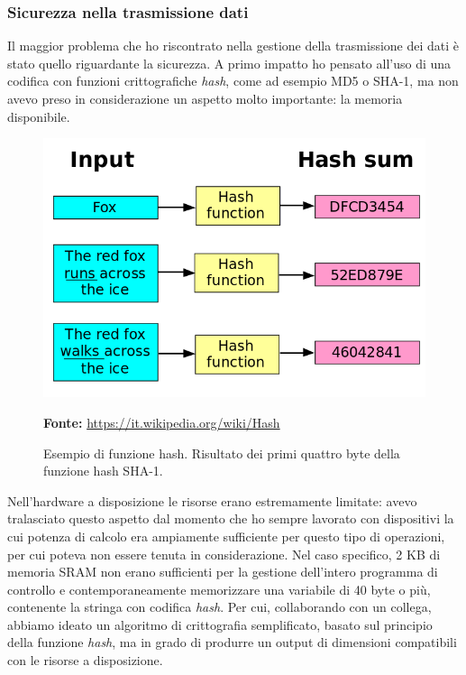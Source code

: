 \subsubsection{Sicurezza nella trasmissione dati}
Il maggior problema che ho riscontrato nella gestione della trasmissione dei dati è stato quello riguardante la sicurezza. A primo impatto ho pensato all'uso di una codifica con funzioni crittografiche \textit{hash}, come ad esempio MD5 o SHA-1, ma non avevo preso in considerazione un aspetto molto importante: la memoria disponibile. 

\begin{figure}[H]
	\begin{center}
	\includegraphics[scale=0.4]{immagini/hash.png}
	\caption{Esempio di funzione hash. Risultato dei primi quattro byte della funzione hash SHA-1.}
	\small{\textbf{Fonte:} \url{https://it.wikipedia.org/wiki/Hash}}
	\end{center}
\end{figure}

Nell'hardware a disposizione le risorse erano estremamente limitate: avevo tralasciato questo aspetto dal momento che ho sempre lavorato con dispositivi la cui potenza di calcolo era ampiamente sufficiente per questo tipo di operazioni, per cui poteva non essere tenuta in considerazione. Nel caso specifico, 2 KB di memoria SRAM non erano sufficienti per la gestione dell'intero programma di controllo e contemporaneamente memorizzare una variabile di 40 byte o più, contenente la stringa con codifica \textit{hash}. Per cui, collaborando con un collega, abbiamo ideato un algoritmo di crittografia semplificato, basato sul principio della funzione \textit{hash}, ma in grado di produrre un output di dimensioni compatibili con le risorse a disposizione.


